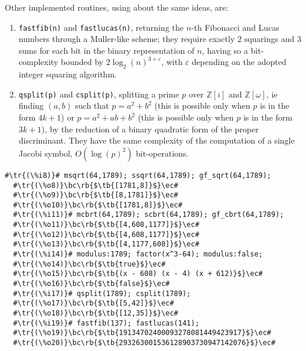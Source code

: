 \documentclass[a4paper,11pt,leqno,fleqn]{artikel3}
\newcommand{\bc}{\begin{center}}
\newcommand{\ec}{\end{center}}
\newcommand{\tr}[1]{\textcolor{red}{#1}}
\newcommand{\tb}[1]{\textcolor{blue}{#1}}
\newcommand{\rb}[1]{\raisebox{2mm}[0mm][1mm]{#1}}
\begin{document}
Other implemented routines, using about the same ideas, are:
\begin{enumerate}
\item \verb!fastfib(n)! and \verb!fastlucas(n)!, returning the $n$-th Fibonacci and Lucas numbers through a Muller-like scheme; they require exactly $2$ squarings and $3$ sums for each bit in the binary representation of $n$, having so a bit-complexity bounded by $2\log_2(n)^{3+\varepsilon}$, with $\varepsilon$ depending on the adopted integer squaring algorithm.
\item \verb!qsplit(p)! and \verb!csplit(p)!, splitting a prime $p$ over $\mathbb{Z}[i]$ and $\mathbb{Z}[\omega]$, ie finding $(a,b)$ such that $p=a^2+b^2$ (this is possible only when $p$ is in the form $4k+1$) or $p=a^2+ab+b^2$ (this is possible only when $p$ is in the form $3k+1$), by the reduction of a binary quadratic form of the proper discriminant. They have the same complexity of the computation of a single Jacobi symbol, $O(\log(p)^2)$ bit-operations.
\end{enumerate}
\vspace{1cm}
\begin{lstlisting}[escapechar=\#]
  #\tr{(\%i8)}# msqrt(64,1789); ssqrt(64,1789); gf_sqrt(64,1789);
  #\tr{(\%o8)}\bc\rb{$\tb{[1781,8]}$}\ec#
  #\tr{(\%o9)}\bc\rb{$\tb{[8,1781]}$}\ec#
  #\tr{(\%o10)}\bc\rb{$\tb{[1781,8]}$}\ec#
  #\tr{(\%i11)}# mcbrt(64,1789); scbrt(64,1789); gf_cbrt(64,1789);
  #\tr{(\%o11)}\bc\rb{$\tb{[4,608,1177]}$}\ec#
  #\tr{(\%o12)}\bc\rb{$\tb{[4,608,1177]}$}\ec#
  #\tr{(\%o13)}\bc\rb{$\tb{[4,1177,608]}$}\ec#
  #\tr{(\%i14)}# modulus:1789; factor(x^3-64); modulus:false;
  #\tr{(\%o14)}\bc\rb{$\tb{true}$}\ec#
  #\tr{(\%o15)}\bc\rb{$\tb{(x - 608) (x - 4) (x + 612)}$}\ec#
  #\tr{(\%o16)}\bc\rb{$\tb{false}$}\ec#
  #\tr{(\%i17)}# qsplit(1789); csplit(1789);
  #\tr{(\%o17)}\bc\rb{$\tb{[5,42]}$}\ec#
  #\tr{(\%o18)}\bc\rb{$\tb{[12,35]}$}\ec#
  #\tr{(\%i19)}# fastfib(137); fastlucas(141);
  #\tr{(\%o19)}\bc\rb{$\tb{19134702400093278081449423917}$}\ec#
  #\tr{(\%o20)}\bc\rb{$\tb{293263001536128903730947142076}$}\ec#
\end{lstlisting}
\end{document}
